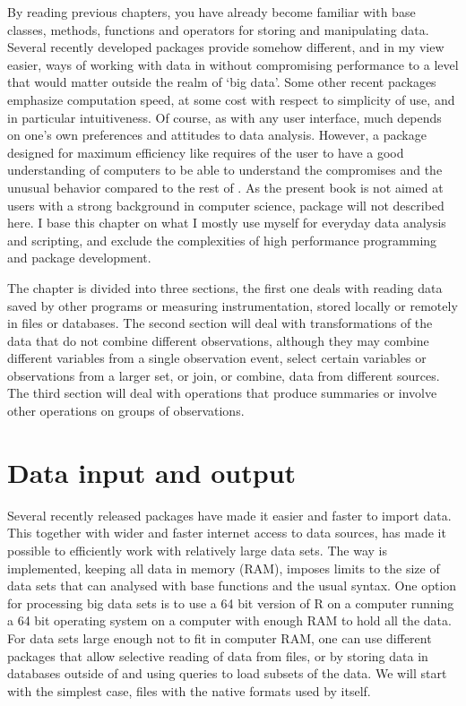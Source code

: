 \documentclass[krantz2]{krantz}\usepackage{knitr}%
\begin{document}
By reading previous chapters, you have already become familiar with base \Rlang classes, methods, functions and operators for storing and manipulating data. Several recently developed packages provide somehow different, and in my view easier, ways of working with data in \Rlang without compromising performance to a level that would matter outside the realm of `big data'. Some other recent packages emphasize computation speed, at some cost with respect to simplicity of use, and in particular intuitiveness. Of course, as with any user interface, much depends on one's own preferences and attitudes to data analysis. However, a package designed for maximum efficiency like  requires of the user to have a good understanding of computers to be able to understand the compromises and the unusual behavior compared to the rest of \Rlang. As the present book is not aimed at users with a strong background in computer science, package  will not described here. I base this chapter on what I mostly use myself for everyday data analysis and scripting, and exclude the complexities of high performance \Rlang programming and package development.

The chapter is divided into three sections, the first one deals with reading data saved by other programs or measuring instrumentation, stored locally or remotely in files or  databases. The second section will deal with transformations of the data that do not combine different observations, although they may combine different variables from a single observation event, select certain variables or observations from a larger set, or join, or combine, data from different sources. The third section will deal with operations that produce summaries or involve other operations on groups of observations.

\section{Data input and output}\label{sec:data:io}

Several recently released \Rlang packages have made it easier and faster to import data. This together with wider and faster internet access to data sources, has made it possible to efficiently work with relatively large data sets. The way \Rlang is implemented, keeping all data in memory (RAM), imposes limits to the size of data sets that can analysed with base \Rlang functions and the usual syntax. One option for processing big data sets is to use a 64 bit version of R on a computer running a 64 bit operating system on a computer with enough RAM to hold all the data. For data sets large enough not to fit in computer RAM, one can use different packages that allow selective reading of data from files, or by storing data in databases outside of \Rlang and using queries to load subsets of the data. We will start with the simplest case, files with the native formats used by \Rlang itself.
\end{document}
